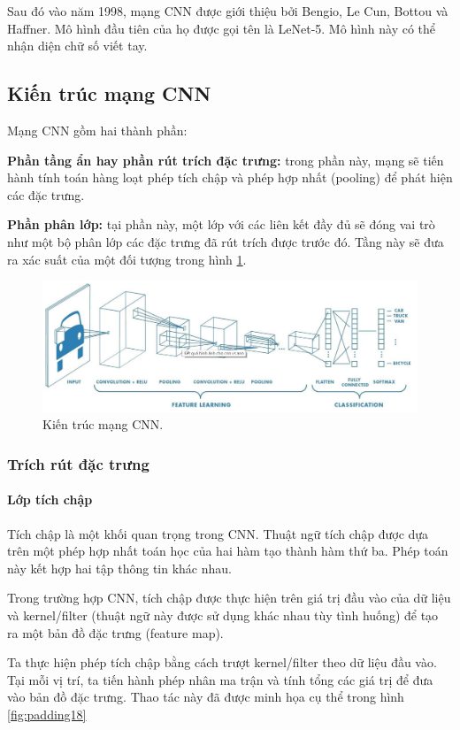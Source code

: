 Sau đó vào năm 1998, mạng CNN được giới thiệu bởi Bengio, Le Cun, Bottou và Haffner. Mô hình đầu tiên của họ được gọi tên là LeNet-5. Mô hình này có thể nhận diện chữ số viết tay.

\subsection{Kiến trúc mạng CNN}
Mạng CNN gồm hai thành phần:

\indent\indent \textbf{Phần tầng ẩn hay phần rút trích đặc trưng:} trong phần này, mạng sẽ tiến hành tính toán hàng loạt phép tích chập và phép hợp nhất (pooling) để phát hiện các đặc trưng.

\indent\indent  \textbf{Phần phân lớp:} tại phần này, một lớp với các liên kết đầy đủ sẽ đóng vai trò như một bộ phân lớp các đặc trưng đã rút trích được trước đó. Tầng này sẽ đưa ra xác suất của một đối tượng trong hình \ref{fig:kientruccnn}.
\begin{figure}[H]
	\centering
	\includegraphics[width=1\linewidth]{images/kientruccnn}
	\caption{Kiến trúc mạng CNN.}
	\label{fig:kientruccnn}
\end{figure}

\subsubsection{Trích rút đặc trưng}
\paragraph{Lớp tích chập}
Tích chập là một khối quan trọng trong CNN. Thuật ngữ tích chập được dựa trên một phép hợp nhất toán học của hai hàm tạo thành hàm thứ ba. Phép toán này kết hợp hai tập thông tin khác nhau.

Trong trường hợp CNN, tích chập được thực hiện trên giá trị đầu vào của dữ liệu và kernel/filter (thuật ngữ này được sử dụng khác nhau tùy tình huống) để tạo ra một bản đồ đặc trưng (feature map). 

Ta thực hiện phép tích chập bằng cách trượt kernel/filter theo dữ liệu đầu vào. Tại mỗi vị trí, ta tiến hành phép nhân ma trận và tính tổng các giá trị để đưa vào bản đồ đặc trưng. Thao tác này đã được minh họa cụ thể trong hình \ref{fig:padding18}


